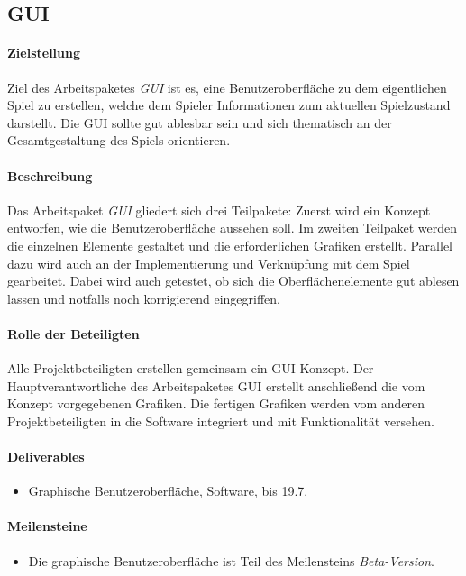 \subsection{GUI}
\label{ap8}

\paragraph{Zielstellung}\noindent
Ziel des Arbeitspaketes \textit{GUI} ist es, eine Benutzeroberfläche zu dem eigentlichen Spiel zu erstellen, welche dem Spieler Informationen zum aktuellen Spielzustand darstellt. Die GUI sollte gut ablesbar sein und sich thematisch an der Gesamtgestaltung des Spiels orientieren.

\paragraph{Beschreibung}\noindent
Das Arbeitspaket \textit{GUI} gliedert sich drei Teilpakete: Zuerst wird ein Konzept entworfen, wie die Benutzeroberfläche aussehen soll. Im zweiten Teilpaket werden die einzelnen Elemente gestaltet und die erforderlichen Grafiken erstellt. Parallel dazu wird auch an der Implementierung und Verknüpfung mit dem Spiel gearbeitet. Dabei wird auch getestet, ob sich die Oberflächenelemente gut ablesen lassen und notfalls noch korrigierend eingegriffen.

\paragraph{Rolle der Beteiligten}\noindent
Alle Projektbeteiligten erstellen gemeinsam ein GUI-Konzept. Der Hauptverantwortliche des Arbeitspaketes GUI erstellt anschließend die vom Konzept vorgegebenen Grafiken. Die fertigen Grafiken werden vom anderen Projektbeteiligten in die Software integriert und mit Funktionalität versehen.

\paragraph{Deliverables}\noindent
\begin{itemize}
\item Graphische Benutzeroberfläche, Software, bis 19.7.
\end{itemize}

\paragraph{Meilensteine}\noindent
\begin{itemize}
\item Die graphische Benutzeroberfläche ist Teil des Meilensteins \textit{Beta-Version}.
\end{itemize}
